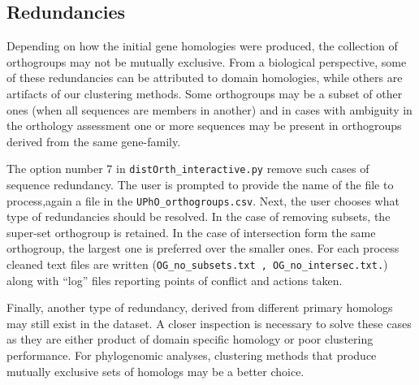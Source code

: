 \documentclass[10pt]{article}
\begin{document}
\subsection{Redundancies}
Depending on how the initial gene homologies were produced, the collection of orthogroups may not be mutually exclusive. From a biological perspective, some of these redundancies can be attributed to domain homologies, while others are artifacts of our clustering methods. Some orthogroups may be a subset of other ones (when all sequences are members in another)  and in cases with ambiguity in the orthology assessment one or more  sequences may be present  in orthogroups derived from the same gene-family.

The option number 7 in \texttt{distOrth\_interactive.py} remove such cases of sequence redundancy. The user is prompted to provide the name of the file to process,again a file in the \texttt{UPhO\_orthogroups.csv}. Next, the user chooses what type of redundancies should be resolved. In the case of removing subsets, the super-set orthogroup is retained. In the case of intersection form the same orthogroup, the largest one is preferred over the smaller ones. For each process cleaned text files are written (\texttt{OG\_no\_subsets.txt , OG\_no\_intersec.txt.}) along with ``log'' files reporting points of conflict and actions taken.

Finally, another type of redundancy, derived from different primary homologs may still exist in the dataset. A closer inspection is necessary to solve these cases as they are either product of domain specific homology or poor clustering performance. For phylogenomic analyses, clustering methods that produce mutually exclusive sets of homologs may be a better choice. 



\end{document}
